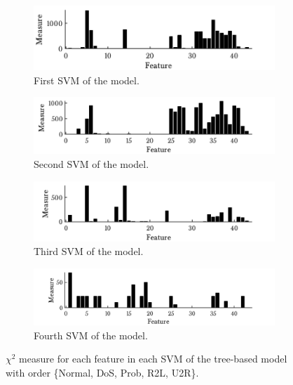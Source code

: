 \begin{figure}[ht!]
        \begin{subfigure}[b]{.97\textwidth}  
            \centering 
            \includegraphics[width=.98\textwidth]{parts/chap-4/img-svm/nl-chi2/svm3.png}
            \caption{First SVM of the model.} 
        \end{subfigure}
        \vfill
         \begin{subfigure}[b]{.97\textwidth}  
            \centering 
            \includegraphics[width=.98\textwidth]{parts/chap-4/img-svm/nl-chi2/svm2.png}
            \caption{Second SVM of the model.} 
        \end{subfigure}
        \vfill
         \begin{subfigure}[b]{.97\textwidth}  
            \centering 
            \includegraphics[width=.98\textwidth]{parts/chap-4/img-svm/nl-chi2/svm4.png}
            \caption{Third SVM of the model.} 
        \end{subfigure}
        \vfill
         \begin{subfigure}[b]{.97\textwidth}  
            \centering 
            \includegraphics[width=.98\textwidth]{parts/chap-4/img-svm/nl-chi2/svm1.png}
            \caption{Fourth SVM of the model.} 
        \end{subfigure}
        \caption{$\chi^2$ measure for each feature in each SVM of the tree-based model with order \{Normal, DoS, Prob, R2L, U2R\}.}
        \label{fig:svm-nl-chi2}
\end{figure}

